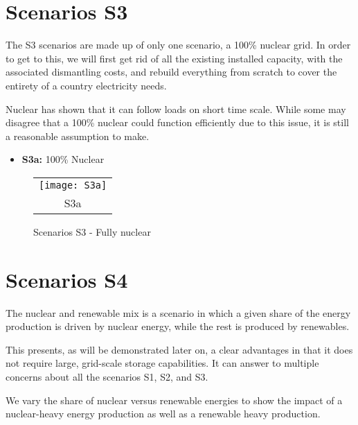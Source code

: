 \section{Scenarios S3}

The S3 scenarios are made up of only one scenario, a 100\% nuclear grid. In order to get to this, we will first get rid of all the existing installed capacity, with the associated dismantling costs, and rebuild everything from scratch to cover the entirety of a country electricity needs.

Nuclear has shown that it can follow loads on short time scale. While some may disagree that a 100\% nuclear could function efficiently due to this issue, it is still a reasonable assumption to make.


\begin{kaobox}[frametitle=S3 scenarios]
\begin{itemize}
	\item \textbf{S3a:} 100\% Nuclear
\end{itemize}
\end{kaobox}


\begin{figure*}
\begin{tabular}{cc}
  \multicolumn{2}{c}{\texttt{[image: S3a]} }\\
\multicolumn{2}{c}{S3a}
\end{tabular}
\caption{Scenarios S3 - Fully nuclear}
\end{figure*}


\section{Scenarios S4}

The nuclear and renewable mix is a scenario in which a given share of the energy production is driven by nuclear energy, while the rest is produced by renewables.

This presents, as will be demonstrated later on, a clear advantages in that it does not require large, grid-scale storage capabilities. It can answer to multiple concerns about all the scenarios S1, S2, and S3.

We vary the share of nuclear versus renewable energies to show the impact of a nuclear-heavy energy production as well as a renewable heavy production.


